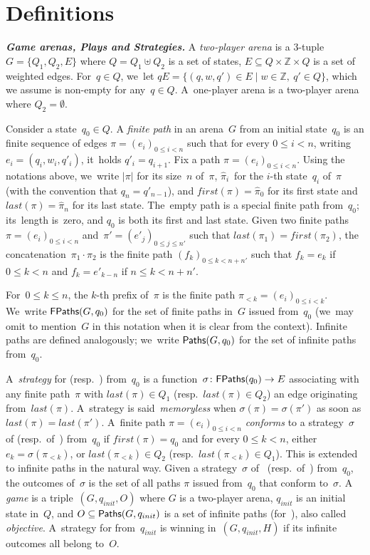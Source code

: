 \section{Definitions}

\textbf{\textit{Game arenas, Plays and Strategies.}}
A \textit{two-player arena} is a $3$-tuple $G=\{Q_1,Q_2,E\}$ where
$Q=Q_1\uplus Q_2$ is a set of states, $E\subseteq Q \times \mathbb{Z}\times Q$ is a set of weighted edges.
For~$q\in Q$, we~let $qE=\{(q,w,q')\in E
\mid w\in\mathbb{Z},\ q'\in Q\}$, which we assume is non-empty for any~$q\in Q$.
%
A~one-player arena is a two-player arena where $Q_2=\emptyset$.

\vskip 0.1cm
Consider a state~$q_0\in Q$.  A \emph{finite path} in an arena~$G$ from an initial state~$q_0$ is an finite sequence of edges $\pi = (e_i)_{0\leq i< n}$ such that for every $0\leq i<n$, writing $e_i=(q_i,w_i,q'_i)$, it~holds $q'_i=q_{i+1}$.  Fix a path $\pi =
(e_i)_{0\leq i< n}$.  Using the notations above, we~write $|\pi|$ for its size~$n$ of~$\pi$, $\hat\pi_i$~for the $i$-th state~$q_i$ of~$\pi$ (with the convention that $q_n=q'_{n-1}$), and $first(\pi)=\hat\pi_0$ for its first state and $last(\pi)=\hat\pi_n$ for its last state. The~empty path is a special finite path from~$q_0$; its~length is~zero, and $q_0$ is both its first and last state.
%
Given two finite paths~$\pi=(e_i)_{0\leq i<n}$ and~$\pi'=(e'_j)_{0\leq j\leq n'}$ such that $last(\pi_1)=first(\pi_2)$, the concatenation~$\pi_1\cdot\pi_2$
is the finite path $(f_k)_{0\leq k<n+n'}$ such that $f_k=e_k$ if~$0\leq k<n$ and $f_k=e'_{k-n}$ if $n\leq k<n+n'$.

\vskip 0.1cm
For~$0\leq k\leq n$, the $k$-th prefix of~$\pi$ is the finite path
$\pi_{<k}=(e_i)_{0\leq i< k}$.  We~write $\textsf{FPaths}(G,q_0)$ for the set of finite paths in~$G$ issued from~$q_0$ (we~may omit to mention~$G$ in this notation when it is clear from the context).  Infinite paths are defined analogously; we~write $\textsf{Paths}(G,q_0)$ for the set of infinite paths from~$q_0$.

\vskip 0.1cm
A~\emph{strategy} for  (resp.~) from~$q_0$ is a function~$\sigma\colon \textsf{FPaths}(q_0)\to E$ associating with any finite path~$\pi$ with $last(\pi)\in Q_1$ (resp.~$last(\pi)\in Q_2$) an edge originating from~$last(\pi)$. 
%
A~strategy is said~\emph{memoryless} when $\sigma(\pi)=\sigma(\pi')$ as soon as $last(\pi)=last(\pi')$.
\vskip 0.1cm
A~finite path $\pi = (e_i)_{0\leq i<n}$ \emph{conforms} to a
strategy~$\sigma$ of  (resp.~of~) from~$q_0$ if
$first(\pi)=q_0$ and for every $0\leq k<n$, either
$e_{k}=\sigma(\pi_{<k})$, or $last(\pi_{<k})\in Q_2$
(resp.~$last(\pi_{<k})\in Q_1$).  This is extended to infinite paths in the natural way. Given a strategy~$\sigma$ of~ (resp.~of~) from~$q_0$, the outcomes of~$\sigma$ is the set of all paths $\pi$ issued from~$q_0$ that conform to~$\sigma$.
\vskip 0.1cm
A \textit{game} is a triple~$(G,q_{init},O)$ where $G$ is a two-player arena, $q_{init}$ is an initial state in~$Q$, and $O \subseteq \textsf{Paths}(G,q_{init})$ is a set of infinite paths (for~), also called \emph{objective}.
A~strategy for  from~$q_{init}$ is winning in~$(G,q_{init},H)$ if its infinite outcomes all belong to~$O$.
\vskip 0.6cm 


